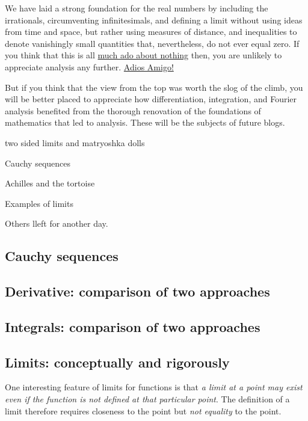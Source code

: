 \documentclass[
  a4paper,
]{article}
\begin{document}
We have laid a strong foundation for the real numbers by including the
irrationals, circumventing infinitesimals, and defining a limit without
using ideas from time and space, but rather using measures of distance,
and inequalities to denote vanishingly small quantities that,
nevertheless, do not ever equal zero. If you think that this is all
\href{https://www.powerthesaurus.org/much_ado_about_nothing/synonyms}{much
ado about nothing} then, you are unlikely to appreciate analysis any
further.
\href{https://www.spanishdict.com/translate/adios\%20amigo}{Adios
Amigo!}

But if you think that the view from the top was worth the slog of the
climb, you will be better placed to appreciate how differentiation,
integration, and Fourier analysis benefited from the thorough renovation
of the foundations of mathematics that led to analysis. These will be
the subjects of future blogs.

two sided limits and matryoshka dolls

Cauchy sequences

Achilles and the tortoise

Examples of limits

Others lleft for another day.

\subsection{Cauchy sequences}\label{cauchy-sequences}

\subsection{Derivative: comparison of two
approaches}\label{derivative-comparison-of-two-approaches}

\subsection{Integrals: comparison of two
approaches}\label{integrals-comparison-of-two-approaches}

\subsection{Limits: conceptually and
rigorously}\label{limits-conceptually-and-rigorously}

One interesting feature of limits for functions is that \emph{a limit at
a point may exist even if the function is not defined at that particular
point}. The definition of a limit therefore requires closeness to the
point but \emph{not equality} to the point.
\end{document}
